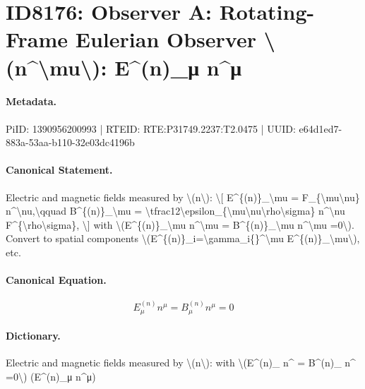 \section*{ID8176: Observer A: Rotating-Frame Eulerian Observer \textbackslash{}(n\textasciicircum{}\textbackslash{}mu\textbackslash{}): E\textasciicircum{}(n)\_μ n\textasciicircum{}μ}
\paragraph{Metadata.}
PiID: 1390956200993 | RTEID: RTE:P31749.2237:T2.0475 | UUID: e64d1ed7-883a-53aa-b110-32e03dc4196b

\paragraph{Canonical Statement.}
Electric and magnetic fields measured by \textbackslash{}(n\textbackslash{}): \textbackslash{}[ E\textasciicircum{}\{(n)\}\_\textbackslash{}mu = F\_\{\textbackslash{}mu\textbackslash{}nu\} n\textasciicircum{}\textbackslash{}nu,\textbackslash{}qquad B\textasciicircum{}\{(n)\}\_\textbackslash{}mu = \textbackslash{}tfrac12\textbackslash{}epsilon\_\{\textbackslash{}mu\textbackslash{}nu\textbackslash{}rho\textbackslash{}sigma\} n\textasciicircum{}\textbackslash{}nu F\textasciicircum{}\{\textbackslash{}rho\textbackslash{}sigma\}, \textbackslash{}] with \textbackslash{}(E\textasciicircum{}\{(n)\}\_\textbackslash{}mu n\textasciicircum{}\textbackslash{}mu = B\textasciicircum{}\{(n)\}\_\textbackslash{}mu n\textasciicircum{}\textbackslash{}mu =0\textbackslash{}). Convert to spatial components \textbackslash{}(E\textasciicircum{}\{(n)\}\_i=\textbackslash{}gamma\_i\{\}\textasciicircum{}\textbackslash{}mu E\textasciicircum{}\{(n)\}\_\textbackslash{}mu\textbackslash{}), etc.

\paragraph{Canonical Equation.}
\[
E^{(n)}_\mu n^\mu = B^{(n)}_\mu n^\mu =0
\]

\paragraph{Dictionary.}
Electric and magnetic fields measured by \textbackslash{}(n\textbackslash{}): with \textbackslash{}(E\textasciicircum{}(n)\_ n\textasciicircum{} = B\textasciicircum{}(n)\_ n\textasciicircum{} =0\textbackslash{}) (E\textasciicircum{}(n)\_μ n\textasciicircum{}μ)

